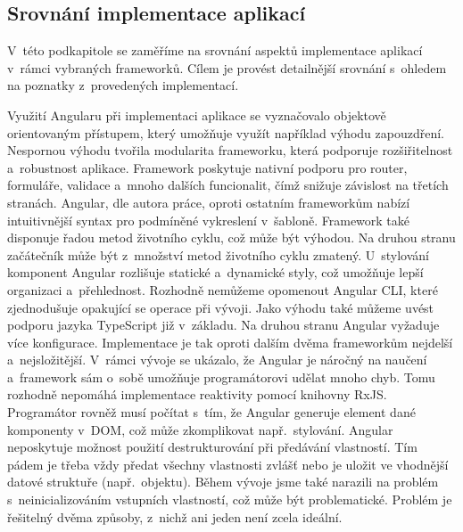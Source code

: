 \newpage




\subsection{Srovnání implementace aplikací}

V~této podkapitole se zaměříme na srovnání aspektů implementace aplikací v~rámci vybraných frameworků. 
Cílem je provést detailnější srovnání s~ohledem na poznatky z~provedených implementací. 

Využití Angularu při implementaci aplikace se vyznačovalo objektově orientovaným přístupem, který umožňuje využít například výhodu zapouzdření. 
Nespornou výhodu tvořila modularita frameworku, která podporuje rozšiřitelnost a~robustnost aplikace. 
Framework poskytuje nativní podporu pro router, formuláře, validace a~mnoho dalších funcionalit, čímž snižuje závislost na třetích stranách. 
Angular, dle autora práce, oproti ostatním frameworkům nabízí intuitivnější syntax pro podmíněné vykreslení v~šabloně. 
Framework také disponuje řadou metod životního cyklu, což může být výhodou. Na druhou stranu začátečník může být z~množství metod životního cyklu zmatený. 
U~stylování komponent Angular rozlišuje statické a~dynamické styly, což umožňuje lepší organizaci a~přehlednost. 
Rozhodně nemůžeme opomenout Angular CLI, které zjednodušuje opakující se operace při vývoji. 
Jako výhodu také můžeme uvést podporu jazyka TypeScript již v~základu. 
Na druhou stranu Angular vyžaduje více konfigurace. Implementace je tak oproti dalším dvěma frameworkům nejdelší a~nejsložitější. 
V~rámci vývoje se ukázalo, že Angular je náročný na naučení a~framework sám o~sobě umožňuje programátorovi udělat mnoho chyb. 
Tomu rozhodně nepomáhá implementace reaktivity pomocí knihovny RxJS. 
Programátor rovněž musí počítat s~tím, že Angular generuje element dané komponenty v~DOM, což může zkomplikovat např.~stylování. 
Angular neposkytuje možnost použití destrukturování při předávání vlastností. 
Tím pádem je třeba vždy předat všechny vlastnosti zvlášť nebo je uložit ve vhodnější datové struktuře (např.~objektu).
Během vývoje jsme také narazili na problém s~neinicializováním vstupních vlastností, což může být problematické. 
Problém je řešitelný dvěma způsoby, z~nichž ani jeden není zcela ideální.


